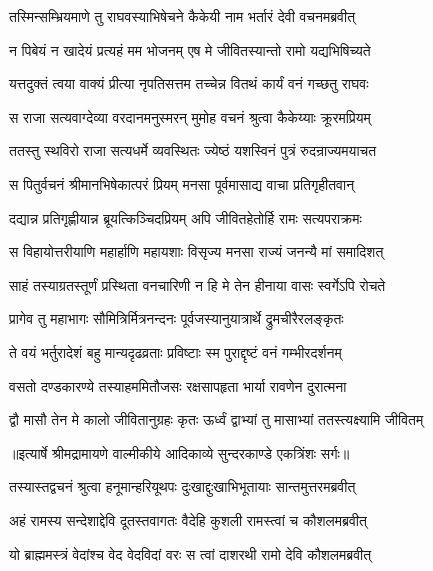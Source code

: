\twolineshloka
{तस्मिन्सम्भ्रियमाणे तु राघवस्याभिषेचने}
{कैकेयी नाम भर्तारं देवी वचनमब्रवीत्} %

\twolineshloka
{न पिबेयं न खादेयं प्रत्यहं मम भोजनम्}
{एष मे जीवितस्यान्तो रामो यद्यभिषिच्यते} %

\twolineshloka
{यत्तदुक्तं त्वया वाक्यं प्रीत्या नृपतिसत्तम}
{तच्चेन्न वितथं कार्यं वनं गच्छतु राघवः} %

\twolineshloka
{स राजा सत्यवाग्देव्या वरदानमनुस्मरन्}
{मुमोह वचनं श्रुत्वा कैकेय्याः क्रूरमप्रियम्} %

\twolineshloka
{ततस्तु स्थविरो राजा सत्यधर्मे व्यवस्थितः}
{ज्येष्ठं यशस्विनं पुत्रं रुदन्राज्यमयाचत} %

\twolineshloka
{स पितुर्वचनं श्रीमानभिषेकात्परं प्रियम्}
{मनसा पूर्वमासाद्य वाचा प्रतिगृहीतवान्} %

\twolineshloka
{दद्यान्न प्रतिगृह्णीयान्न ब्रूयत्किञ्चिदप्रियम्}
{अपि जीवितहेतोर्हि रामः सत्यपराक्रमः} %

\twolineshloka
{स विहायोत्तरीयाणि महार्हाणि महायशाः}
{विसृज्य मनसा राज्यं जनन्यै मां समादिशत्} %

\twolineshloka
{साहं तस्याग्रतस्तूर्णं प्रस्थिता वनचारिणी}
{न हि मे तेन हीनाया वासः स्वर्गेऽपि रोचते} %

\twolineshloka
{प्रागेव तु महाभागः सौमित्रिर्मित्रनन्दनः}
{पूर्वजस्यानुयात्रार्थे द्रुमचीरैरलङ्कृतः} %

\twolineshloka
{ते वयं भर्तुरादेशं बहु मान्यदृढव्रताः}
{प्रविष्टाः स्म पुराद्दृष्टं वनं गम्भीरदर्शनम्} %

\twolineshloka
{वसतो दण्डकारण्ये तस्याहममितौजसः}
{रक्षसापहृता भार्या रावणेन दुरात्मना} %

\twolineshloka
{द्वौ मासौ तेन मे कालो जीवितानुग्रहः कृतः}
{ऊर्ध्वं द्वाभ्यां तु मासाभ्यां ततस्त्यक्ष्यामि जीवितम्} %


{॥इत्यार्षे श्रीमद्रामायणे वाल्मीकीये आदिकाव्ये सुन्दरकाण्डे एकत्रिंशः सर्गः॥}


\twolineshloka
{तस्यास्तद्वचनं श्रुत्वा हनूमान्हरियूथपः}
{दुःखाद्दुःखाभिभूतायाः सान्तमुत्तरमब्रवीत्} %

\twolineshloka
{अहं रामस्य सन्देशाद्देवि दूतस्तवागतः}
{वैदेहि कुशली रामस्त्वां च कौशलमब्रवीत्} %

\twolineshloka
{यो ब्राह्ममस्त्रं वेदांश्च वेद वेदविदां वरः}
{स त्वां दाशरथी रामो देवि कौशलमब्रवीत्} %

